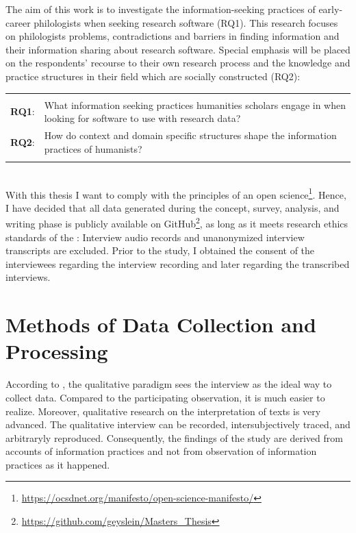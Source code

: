 \documentclass[12pt, a4paper, titlepage, oneside, abstract=true, toc=listof, toc=bibliography, BCOR=1cm]{scrreprt}
\begin{document}
The aim of this work is to investigate the information-seeking practices of early-career philologists when seeking research software (RQ1). This research focuses on philologists problems, contradictions and barriers in finding information and their information sharing about research software. Special emphasis will be placed on the respondents' recourse to their own research process and the knowledge and practice structures in their field \citep{Hjorland1995} which are socially constructed (RQ2):

\begin{tabular}{p{2cm}p{12cm}}
& \\
\textbf{RQ1}: & What information seeking practices humanities scholars engage in when looking for software to use with research data? \\ 
\textbf{RQ2}: & How do context and domain specific structures shape the information practices of humanists? \\ 
& \\
\end{tabular}\\  

With this thesis I want to comply with the principles of an open science\footnote{\url{https://ocsdnet.org/manifesto/open-science-manifesto/}}. Hence, I have decided that all data generated during the concept, survey, analysis, and writing phase is publicly available on GitHub\footnote{\url{https://github.com/geyslein/Masters_Thesis}}, as long as it meets research ethics standards of the \citet{DeutscheForschungsgemeinschaft2019}: Interview audio records and unanonymized interview transcripts are excluded. Prior to the study, I obtained the consent of the interviewees regarding the interview recording and later regarding the transcribed interviews.

\section{Methods of Data Collection and Processing}
\label{sec:data_collection}
According to \citet[p. 329]{Lamnek2005}, the qualitative paradigm sees the interview as the ideal way to collect data. Compared to the participating observation, it is much easier to realize. Moreover, qualitative research on the interpretation of texts is very advanced. The qualitative interview can be recorded, intersubjectively traced, and arbitraryly reproduced. Consequently, the findings of the study are derived from accounts of information practices and not from observation of information practices as it happened. 
\end{document}
